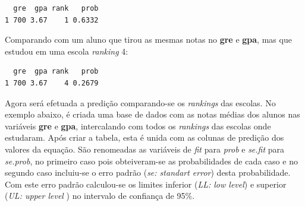 \documentclass[12pt,brazil,oneside]{book}
\newenvironment{Shaded}{\begin{snugshade}}{\end{snugshade}}
\newcommand{\DataTypeTok}[1]{\textcolor[rgb]{0.13,0.29,0.53}{#1}}
\newcommand{\DecValTok}[1]{\textcolor[rgb]{0.00,0.00,0.81}{#1}}
\newcommand{\FloatTok}[1]{\textcolor[rgb]{0.00,0.00,0.81}{#1}}
\newcommand{\KeywordTok}[1]{\textcolor[rgb]{0.13,0.29,0.53}{\textbf{#1}}}
\newcommand{\NormalTok}[1]{#1}
\newcommand{\OperatorTok}[1]{\textcolor[rgb]{0.81,0.36,0.00}{\textbf{#1}}}
\newcommand{\StringTok}[1]{\textcolor[rgb]{0.31,0.60,0.02}{#1}}
\begin{document}
\begin{verbatim}
  gre  gpa rank   prob
1 700 3.67    1 0.6332
\end{verbatim}

Comparando com um aluno que tirou as mesmas notas no \textbf{gre} e
\textbf{gpa}, mas que estudou em uma escola \emph{ranking} 4:

\begin{Shaded}
\end{Shaded}

\begin{verbatim}
  gre  gpa rank   prob
1 700 3.67    4 0.2679
\end{verbatim}

Agora será efetuada a predição comparando-se os \emph{rankings} das
escolas. No exemplo abaixo, é criada uma base de dados com as notas
médias dos alunos nas variáveis \textbf{gre} e \textbf{gpa},
intercalando com todos os \emph{rankings} das escolas onde estudaram.
Após criar a tabela, esta é unida com as colunas de predição dos valores
da equação. São renomeadas as variáveis de \emph{fit} para \emph{prob} e
\emph{se.fit} para \emph{se.prob}, no primeiro caso pois obteiveram-se
as probabilidades de cada caso e no segundo caso incluiu-se o erro
padrão (\emph{se: standart error}) desta probabilidade. Com este erro
padrão calculou-se os limites inferior (\emph{LL: low level}) e superior
(\emph{UL: upper level }) no intervalo de confiança de 95\%.
\end{document}
